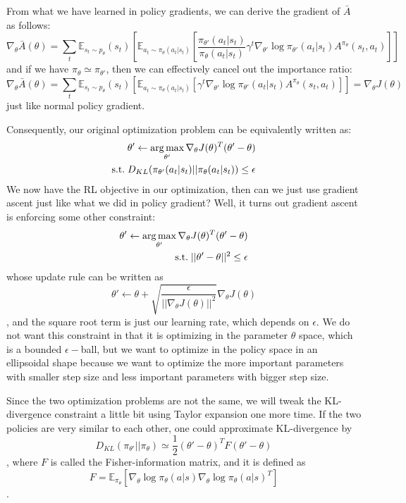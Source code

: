 From what we have learned in policy gradients, we can derive the gradient of $\bar{A}$ as follows:
$$\nabla_{\theta}\bar{A}(\theta) = \sum_t \mathbb{E}_{s_t\sim p_{\theta}}(s_t)\left[\mathbb{E}_{a_t\sim \pi_\theta(a_t|s_t)}\left[\frac{\pi_{\theta'}(a_t|s_t)}{\pi_\theta(a_t|s_t)}\gamma^t\nabla_{\theta'}\log\pi_{\theta'}(a_t|s_t) A^{\pi_\theta}(s_t,a_t)\right]\right]$$
and if we have $\pi_\theta \simeq \pi_{\theta'}$, then we can effectively cancel out the importance ratio:
$$\nabla_{\theta}\bar{A}(\theta) = \sum_t \mathbb{E}_{s_t\sim p_{\theta}}(s_t)\left[\mathbb{E}_{a_t\sim \pi_\theta(a_t|s_t)}\left[\gamma^t\nabla_{\theta'}\log\pi_{\theta'}(a_t|s_t) A^{\pi_\theta}(s_t,a_t)\right]\right] = \nabla_\theta J(\theta)$$
just like normal policy gradient.

Consequently, our original optimization problem can be equivalently written as:
\begin{equation}
\begin{aligned}
\theta'\leftarrow \operatorname*{arg\,max}_{\theta'} \nabla_{\theta}J(\theta)^T(\theta'-\theta)\\
\mathrm{s.t. }\;D_{KL}(\pi_{\theta'}(a_t|s_t)||\pi_{\theta}(a_t|s_t))\leq \epsilon
    \end{aligned}
\end{equation}
We now have the RL objective in our optimization, then can we just use gradient ascent just like what we did in policy gradient? Well, it turns out gradient ascent is enforcing some other constraint:
\begin{equation}
\begin{aligned}
\theta'\leftarrow \operatorname*{arg\,max}_{\theta'} \nabla_{\theta}J(\theta)^T(\theta'-\theta)\\
\mathrm{s.t. }\;\lvert|\theta'-\theta|\rvert^2\leq \epsilon
    \end{aligned}
\end{equation}
whose update rule can be written as 
\[\theta' \leftarrow \theta + \sqrt{\frac{\epsilon}{\lvert|\nabla_\theta J(\theta)|\rvert^2}}\nabla_\theta J(\theta)\]
, and the square root term is just our learning rate, which depends on $\epsilon$. We do not want this constraint in that it is optimizing in the parameter $\theta$ space, which is a bounded $\epsilon-$ball, but we want to optimize in the policy space in an ellipsoidal shape because we want to optimize the more important parameters with smaller step size and less important parameters with bigger step size.

Since the two optimization problems are not the same, we will tweak the KL-divergence constraint a little bit using Taylor expansion one more time. If the two policies are very similar to each other, one could approximate KL-divergence by 
\[D_{KL}(\pi_{\theta'}||\pi_\theta) \simeq \frac{1}{2}(\theta' - \theta)^TF(\theta'-\theta)\],
where $F$ is called the Fisher-information matrix, and it is defined as
\[F = \mathbb{E}_{\pi_\theta}{\left[\nabla_\theta\log \pi_\theta(a|s)\nabla_\theta\log\pi_\theta(a|s)^T\right]}\].


